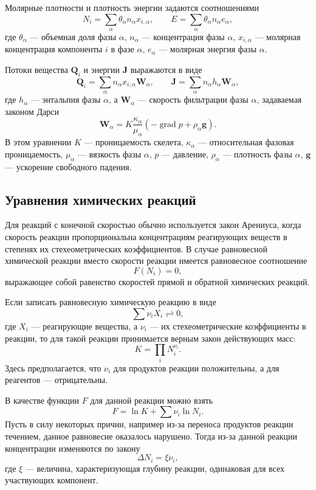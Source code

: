 \documentclass[14pt,a4paper]{extarticle}
\newcommand{\grad}{\operatorname{grad}}
\renewcommand{\vec}[1]{\boldsymbol{\mathbf{#1}}}
\begin{document}
Молярные плотности и плотность энергии задаются соотношениями
\[
N_i = \sum_{\alpha} \theta_\alpha n_\alpha x_{i,\alpha},\qquad
E = \sum_{\alpha} \theta_\alpha n_\alpha e_{\alpha},
\]
где $\theta_\alpha$ --- объемная доля фазы $\alpha$, $n_\alpha$ --- концентрация фазы $\alpha$, $x_{i,\alpha}$ --- молярная концентрация компоненты $i$ в фазе $\alpha$, $e_\alpha$ --- молярная энергия фазы $\alpha$.

Потоки вещества $\vec Q_i$ и энергии $\vec J$ выражаются в виде
\[
\vec Q_i = \sum_\alpha n_\alpha x_{i,\alpha} \vec W_\alpha, \qquad
\vec J = \sum_\alpha n_\alpha h_{\alpha} \vec W_\alpha,
\]
где $h_\alpha$ --- энтальпия фазы $\alpha$, а $\vec W_\alpha$ --- скорость фильтрации фазы $\alpha$, задаваемая законом Дарси
\[
\vec W_\alpha = K \frac{\kappa_\alpha}{\mu_\alpha} (-\grad p + \rho_\alpha \vec g).
\]
В этом уравнении $K$ --- проницаемость скелета, $\kappa_\alpha$ --- относительная фазовая проницаемость, $\mu_\alpha$ --- вязкость фазы $\alpha$, $p$ --- давление, $\rho_\alpha$ --- плотность фазы $\alpha$, $\vec g$ --- ускорение свободного падения.

\subsection{Уравнения химических реакций}

Для реакций с конечной скоростью обычно используется закон Арениуса, когда скорость реакции пропорциональна концентрациям реагирующих веществ в степенях их стехеометрических коэффициентов.
В случае равновесной химической реакции вместо скорости реакции имеется равновесное соотношение
$$F(N_i) = 0,$$
выражающее собой равенство скоростей прямой и обратной химических реакций.

Если записать равновесную химическую реакцию в виде 
$$\sum{\nu_i X_i} \rightleftharpoons 0,$$
где $X_i$ --- реагирующие вещества, а $\nu_i$ --- их стехеометрические коэффициенты в реакции, то для такой реакции принимается верным закон действующих масс:
$$
K = \prod_i N_i^{\nu_i}.
$$
Здесь предполагается, что $\nu_i$ для продуктов реакции положительны, а для реагентов --- отрицательны. 

В качестве функции $F$ для данной реакции можно взять 
$$F = \ln{K} + \sum{\nu_i \ln{N_i}}.$$
Пусть в силу  некоторых причин, например из-за переноса продуктов реакции течением, данное равновесие оказалось нарушено. Тогда из-за данной реакции концентрации изменяются по закону $$\Delta N_i = \xi \nu_i,$$ где $\xi$ --- величина, характеризующая глубину реакции, одинаковая для всех участвующих компонент.
\end{document}
